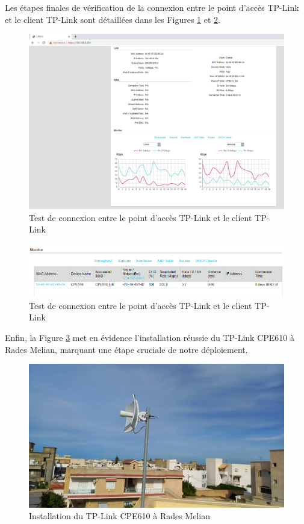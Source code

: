 Les étapes finales de vérification de la connexion entre le point d'accès TP-Link et le client TP-Link sont détaillées dans les Figures \ref{Chap2.3.10} et \ref{Chap2.3.11}.

\begin{figure}[H]
\centering
\includegraphics[width=15cm]{Images/tplink37.png}
\caption{Test de connexion entre le point d'accès TP-Link et le client TP-Link}
\label{Chap2.3.10}
\end{figure}

\begin{figure}[H]
\centering
\includegraphics[width=15cm]{Images/TPLink4.png}
\caption{Test de connexion entre le point d'accès TP-Link et le client TP-Link}
\label{Chap2.3.11}
\end{figure}

Enfin, la Figure \ref{Chap2.3.12} met en évidence l'installation réussie du TP-Link CPE610 à Rades Melian, marquant une étape cruciale de notre déploiement.

\begin{figure}[H]
\centering
\includegraphics[width=15cm]{Images/BRadesMelian-TPLinkCEP610-1.jpeg}
\caption{Installation du TP-Link CPE610 à Rades Melian}
\label{Chap2.3.12}
\end{figure}

